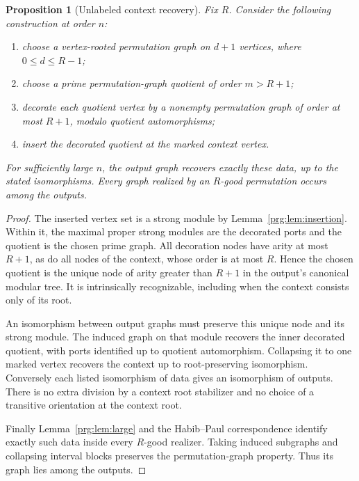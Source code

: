 \documentclass[11pt,letterpaper]{article}
\numberwithin{equation}{section}
\newtheorem{proposition}[theorem]{Proposition}
\theoremstyle{definition}\newtheorem{definition}[theorem]{Definition}
\theoremstyle{remark}\newtheorem{remark}[theorem]{Remark}
\begin{document}
\begin{proposition}[Unlabeled context recovery]\label{prg:prop:context}
Fix $R$. Consider the following construction at order $n$:
\begin{enumerate}
\item choose a vertex-rooted permutation graph on $d+1$ vertices,
      where $0\leq d\leq R-1$;
\item choose a prime permutation-graph quotient of order $m>R+1$;
\item decorate each quotient vertex by a nonempty permutation graph
      of order at most $R+1$, modulo quotient automorphisms;
\item insert the decorated quotient at the marked context vertex.
\end{enumerate}
For sufficiently large $n$, the output graph recovers exactly these
data, up to the stated isomorphisms. Every graph realized by an
$R$-good permutation occurs among the outputs.
\end{proposition}
\begin{proof}
The inserted vertex set is a strong module by
Lemma~\ref{prg:lem:insertion}. Within it, the maximal proper strong
modules are the decorated ports and the quotient is the chosen
prime graph. All decoration nodes have arity at most $R+1$, as do
all nodes of the context, whose order is at most $R$. Hence the
chosen quotient is the unique node of arity greater than $R+1$
in the output's canonical modular tree. It is intrinsically
recognizable, including when the context consists only of its root.

An isomorphism between output graphs must preserve this unique node
and its strong module. The induced graph on that module recovers
the inner decorated quotient, with ports identified up to quotient
automorphism. Collapsing it to one marked vertex recovers the
context up to root-preserving isomorphism. Conversely each listed
isomorphism of data gives an isomorphism of outputs. There is no
extra division by a context root stabilizer and no choice of a
transitive orientation at the context root.

Finally Lemma~\ref{prg:lem:large} and the Habib--Paul correspondence
identify exactly such data inside every $R$-good realizer. Taking
induced subgraphs and collapsing interval blocks preserves the
permutation-graph property. Thus its graph lies among the outputs.
\end{proof}
\end{document}
